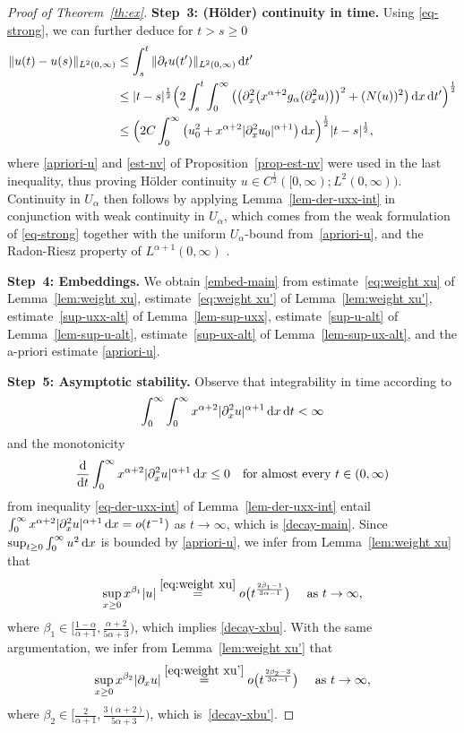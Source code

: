 \documentclass[reqno,12pt]{amsart}
\renewcommand{\d}{\ensuremath{\mathrm{d}}}
\renewcommand{\d}{\ensuremath{{\rm d}}}
\numberwithin{equation}{section}
\begin{document}
\begin{proof}[Proof of Theorem~\ref{th:ex}]
%
\textbf{Step~3: (H\"older) continuity in time. }
%
Using \eqref{eq-strong}, we can further deduce for $t > s \ge 0$
%
\begin{align*}
\|u(t) - u(s)\|_{L^2(0,\infty)} &\le \int_s^t \|\partial_t u(t')\|_{L^2(0,\infty)} \, \d t'
\\ &\le |t-s|^{\frac 1 2} \Big(2 \int_s^t \int_0^\infty \big(\big(\partial_x^2\big(x^{\alpha+2} g_\alpha(\partial_x^2 u)\big)\big)^2 + (N(u))^2\big) \, \d x \, \d t'\Big)^{\frac 1 2} \\
&\le \Big(2 C \int_0^\infty \big(u_0^2 + x^{\alpha+2} |\partial_x^2 u_0|^{\alpha+1}\big) \, \d x\Big)^{\frac 1 2} |t-s|^{\frac 1 2},
\end{align*}
%
where \eqref{apriori-u} and \eqref{est-nv} of Proposition~\ref{prop-est-nv} were used in the last inequality, thus proving H\"older continuity $u \in C^{\frac 1 2}([0,\infty);L^2(0,\infty))$. Continuity in $U_\alpha$ then follows by applying Lemma~\ref{lem-der-uxx-int} in conjunction with weak continuity in $U_\alpha$, which comes from the weak formulation of \eqref{eq-strong} together with the uniform $U_\alpha$-bound
from~\eqref{apriori-u}, and the Radon-Riesz property of $L^{\alpha+1}(0,\infty)$ \cite[Proposition~3.32]{brezis2011}.

%
\bigskip
%

%
\textbf{Step~4: Embeddings. }
%
We obtain \eqref{embed-main} from estimate~\eqref{eq:weight xu} of Lemma~\ref{lem:weight xu},
estimate~\eqref{eq:weight xu'} of Lemma~\ref{lem:weight xu'},
estimate~\eqref{sup-uxx-alt} of Lemma~\ref{lem-sup-uxx},
estimate~\eqref{sup-u-alt} of Lemma~\ref{lem-sup-u-alt},
estimate~\eqref{sup-ux-alt} of Lemma~\ref{lem-sup-ux-alt}, 
and the a-priori estimate \eqref{apriori-u}.


%
\bigskip
%

%
\textbf{Step~5: Asymptotic stability. }
%
Observe that integrability in time according to
%
\[
\int_0^\infty \int_0^\infty x^{\alpha+2} |\partial_x^2 u|^{\alpha+1} \, \d x \, \d t < \infty
\]
%
and the monotonicity
\[
\frac{\d}{\d t} \int_0^\infty x^{\alpha+2} |\partial_x^2 u|^{\alpha+1} \, \d x \le 0 \quad \text{for almost every } t \in (0,\infty)
\]
from inequality \eqref{eq-der-uxx-int} of Lemma~\ref{lem-der-uxx-int} entail $\int_0^\infty x^{\alpha+2} |\partial_x^2 u|^{\alpha+1} \, \d x = o(t^{-1})$
as $t \to \infty$, which is \eqref{decay-main}. Since $\sup_{t \ge 0} \int_0^\infty u^2 \, \d x$ is bounded by \eqref{apriori-u}, we infer from Lemma~\ref{lem:weight xu} that 
%
\[
\sup_{x \ge 0} x^{\beta_1} |u|
\stackrel{\eqref{eq:weight xu}}{=}
o\big(t^{\frac{2\beta_1-1}{3\alpha-1}}\big)
\quad \text{ as } t \to \infty,
\]
%
where
$\beta_1 \in \big[\frac{1-\alpha}{\alpha+1},
\frac{\alpha+2}{5\alpha+3}\big)$, which implies \eqref{decay-xbu}.
With the same argumentation, we infer from Lemma~\ref{lem:weight xu'}
that 
%
\[
\sup_{x \ge 0} x^{\beta_2}
|\partial_x u|
\stackrel{\eqref{eq:weight xu'}}{=}
o\big(t^{\frac{2\beta_2-3}{3\alpha-1}}\big)
\quad \text{ as } t \to \infty,
\]
%
where
$\beta_2 \in \big[\frac{2}{\alpha+1},
\frac{3(\alpha+2)}{5\alpha+3}\big)$,
which is~\eqref{decay-xbu'}.
\end{proof}
%
\end{document}
